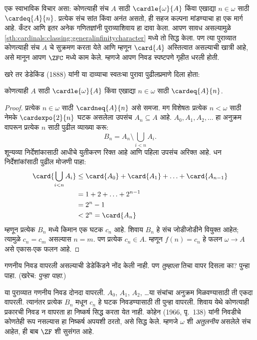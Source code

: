 \begin{ex}
एक स्वाभाविक विचार असा: कोणत्याही संच $A$ साठी $\cardle{\omega}{A}$ किंवा एखाद्या $n \in \omega$ साठी $\cardeq{A}{n}$. प्रत्येक संच सांत किंवा अनंत असतो, ही सहज कल्पना मांडण्याचा हा एक मार्ग आहे. कँटर आणि इतर अनेक गणितज्ञांनी पुराव्याशिवाय हा दावा केला. आपण सावध असल्यामुळे \ref{sth:cardinals:classing:generalinfinitycharacter} मध्ये तो सिद्ध केला. पण त्या पुराव्यात कोणत्याही संच $A$ चे सुक्रमण करता येते आणि म्हणून $\card{A}$ अस्तित्वात असल्याची खात्री आहे, असे मानून आपण $\ZFC$ मध्ये काम केले. म्हणजे आपण निवड स्पष्टपणे गृहीत धरली होती.

खरे तर डेडेकिंड (1888) यांनी या दाव्याचा स्वतःचा पुरावा पुढीलप्रमाणे दिला होता:

\begin{thm}
कोणत्याही $A$ साठी $\cardle{\omega}{A}$ किंवा एखाद्या $n \in \omega$ साठी $\cardeq{A}{n}$.
\end{thm}

\begin{proof}
प्रत्येक $n \in \omega$ साठी $\cardneq{A}{n}$ असे समजा. मग विशेषतः प्रत्येक $n < \omega$ साठी नेमके $\cardexpo{2}{n}$ घटक असलेला उपसंच $A_n \subseteq A$ आहे. $A_0, A_1, A_2,
\ldots$ हा अनुक्रम वापरून प्रत्येक $n$ साठी पुढील व्याख्या करू:
\[
	B_n = A_n \setminus \bigcup_{i < n} A_i.
\]
शून्यव्या निर्देशांकासाठी आधीचे युतीकरण रिक्त आहे आणि पहिला उपसंच अरिक्त आहे. धन निर्देशांकांसाठी पुढील मोजणी पाहा:
\begin{align*}
	\card{\bigcup_{i < n}A_i}
	&\leq \card{A_0} + \card{A_1} + \ldots + \card{A_{n-1}}\\
	&=1 + 2 + \ldots + 2^{n-1}\\
	& = 2^n - 1\\
	& < 2^n = \card{A_n}
\end{align*}
म्हणून प्रत्येक $B_n$ मध्ये किमान एक घटक $c_n$ आहे. शिवाय $B_n$ हे संच जोडीजोडीने वियुक्त आहेत; त्यामुळे $c_n = c_m$ असल्यास $n = m$. पण प्रत्येक $c_n
\in A$. म्हणून $f(n) = c_n$ हे फलन $\omega \to A$ असे एकास-एक फलन आहे.
\end{proof}
\noindent
गणनीय निवड वापरली असल्याची डेडेकिंडने नोंद केली नाही. पण \emph{तुम्हाला} तिचा वापर दिसला का? पुन्हा पाहा. (खरेच: \emph{पुन्हा पाहा}.)

या पुराव्यात गणनीय निवड दोनदा वापरली. $A_0$, $A_1$, $A_2$, \dots\@ या संचांचा अनुक्रम मिळवण्यासाठी ती एकदा वापरली. त्यानंतर प्रत्येक $B_n$ मधून $c_n$ हे घटक निवडण्यासाठी ती पुन्हा वापरली. शिवाय येथे कोणत्याही प्रकारची निवड न वापरता हा निष्कर्ष सिद्ध करता येत नाही. कोहेन (1966, पृ.~138) यांनी निवडीचे कोणतेही रूप नसल्यास हा निष्कर्ष अपयशी ठरतो, असे सिद्ध केले. म्हणजे $\omega$ शी \emph{अतुलनीय} असलेले संच आहेत, ही बाब $\ZF$ शी सुसंगत आहे.
\end{ex}

